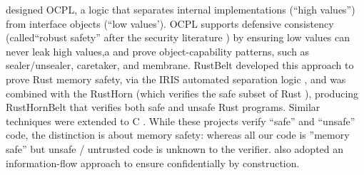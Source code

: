 \citet{ddd}  designed OCPL, a logic
that %
separates internal implementations (``high values'')
from interface objects
(``low values'). %
OCPL supports defensive
consistency %
(called``robust safety'' after the
security literature \cite{Bengtson})
by ensuring
low values can never leak high values,a %
and 
prove %
object-capability patterns, such as
sealer/unsealer, caretaker, and membrane.
%
%
RustBelt \cite{RustBelt18}
developed this approach to prove Rust memory safety,
via the IRIS automated
separation logic \cite{iris-jfp2018},
%
%
and was combined 
with the RustHorn  %
(which verifies the safe subset of Rust \cite{RustHorn-toplas2021}),
producing RustHornBelt \cite{RustHornBelt-pldi2022} that verifies
both safe and unsafe Rust programs.%
Similar techniques were extended to C \cite{RefinedC-pldi2021}.
While these projects 
verify ``safe'' and ``unsafe'' code, 
%
the distinction is about memory safety:%
%
%
%
whereas all our code is ''memory safe''
but unsafe / untrusted code
is unknown to the verifier.
%
%
\citet{schaeferCbC} also adopted
an information-flow approach to ensure confidentially by construction.

